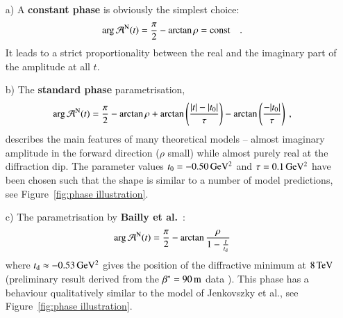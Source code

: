 \begin{enumerate}

\item[a)]
A {\bf constant phase} is obviously the simplest choice:
\begin{equation}
\label{eq:nuc phase con}
\arg {\cal A}^{\rm N}(t) = {\pi\over 2} - \arctan\rho = \hbox{const} \quad .
\end{equation}
It leads to a strict proportionality between the real and the imaginary part of the amplitude at all $t$.

\item[b)]
The {\bf standard phase} parametrisation,
\begin{equation}
\label{eqn:nuc phase std}
\arg {\cal A}^{\rm N}(t) = {\pi\over 2} - \arctan\rho + \arctan \left(\frac{|t|-|t_{0}|}{\tau}\right) -  \arctan \left(\frac{-|t_{0}|}{\tau}\right) \: ,
\end{equation}
describes the main features of many theoretical models -- almost imaginary amplitude in the forward direction ($\rho$ small) while almost purely real at the diffraction dip. The parameter values $t_0 = - 0.50\,{\rm GeV^2}$ and $\tau = 0.1\,{\rm GeV^2}$ have been chosen such that the shape is similar to a number of model predictions, see Figure~\ref{fig:phase illustration}.

\item[c)]
The parametrisation by {\bf Bailly et al.}~\cite{bailly87}:
\begin{equation}
\label{eq:nuc phase bai}
	\arg {\cal A}^{\rm N}(t) = {\pi\over 2} - \arctan {\rho\over 1 - {t\over t_{\rm d}}}
\end{equation}
where $t_{\rm d} \approx -0.53\,{\rm GeV^2}$ gives the position of the diffractive minimum at $8\,{\rm TeV}$ (preliminary result derived from the $\beta^* = 90\,{\rm m}$ data \cite{8tev-90m}). This phase has a behaviour qualitatively similar to the model of Jenkovszky et al., see Figure~\ref{fig:phase illustration}.


\end{enumerate}
